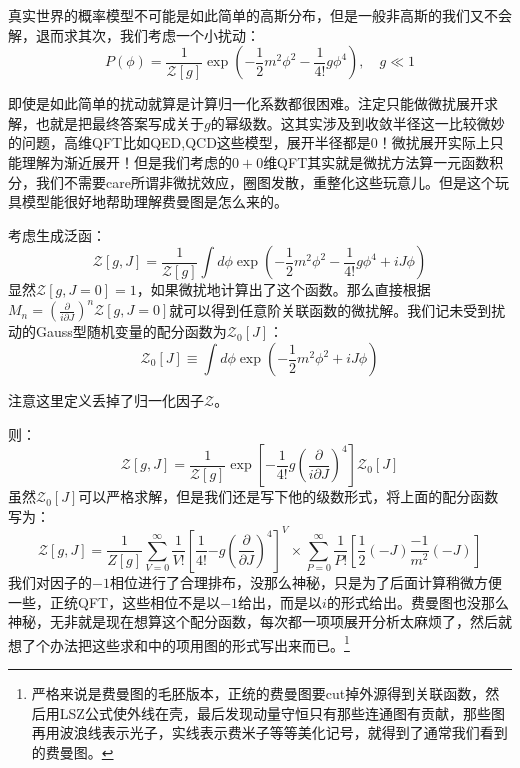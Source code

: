 真实世界的概率模型不可能是如此简单的高斯分布，但是一般非高斯的我们又不会解，退而求其次，我们考虑一个小扰动：
\begin{equation}
	P(\phi)=\frac1{\mathcal{Z}[g]}\exp(-\frac12m^2\phi^2-\frac1{4!}g\phi^4),\quad g\ll 1
\end{equation}

即使是如此简单的扰动就算是计算归一化系数都很困难。注定只能做微扰展开求解，也就是把最终答案写成关于$g$的幂级数。这其实涉及到收敛半径这一比较微妙的问题，高维QFT比如QED,QCD这些模型，展开半径都是0！微扰展开实际上只能理解为渐近展开！但是我们考虑的$0+0$维QFT其实就是微扰方法算一元函数积分，我们不需要care所谓非微扰效应，圈图发散，重整化这些玩意儿。但是这个玩具模型能很好地帮助理解费曼图是怎么来的。

考虑生成泛函：
\begin{equation}
	\mathcal{Z}[g,J]=\frac1{\mathcal{Z}[g]}\int d\phi\exp(-\frac12m^2\phi^2-\frac1{4!}g\phi^4+iJ\phi)
\end{equation}
显然$\mathcal{Z}[g,J=0]=1$，如果微扰地计算出了这个函数。那么直接根据$M_n=\left(\frac{\partial}{i\partial J}\right)^n\mathcal{Z}[g,J=0]$就可以得到任意阶关联函数的微扰解。我们记未受到扰动的Gauss型随机变量的配分函数为$\mathcal{Z}_0[J]$：
\begin{equation}
	\mathcal{Z}_0[J]\equiv \int d\phi \exp(-\frac{1}{2}m^2\phi^2+iJ\phi)
\end{equation}
\begin{remark}
	注意这里定义丢掉了归一化因子$\mathcal{Z}$。
\end{remark}
则：
\begin{equation}
	\mathcal{Z}[g,J]=\frac{1}{\mathcal{Z}[g]}\exp\left[-\frac1{4!}g\left(\frac{\partial}{i\partial J}\right)^4\right]\mathcal{Z}_0[J]
\end{equation}
虽然$\mathcal{Z}_0[J]$可以严格求解，但是我们还是写下他的级数形式，将上面的配分函数写为：
\begin{equation}
	\mathcal{Z}[g,J]=\frac1{Z[g]}\sum_{V=0}^{\infty}\frac{1}{V!}\left[\frac{1}{4!}{-g}\left(\frac{\partial}{\partial J}\right)^4\right]^V\times \sum_{P=0}^{\infty}\frac{1}{P!}\left[\frac12 (-J)\frac{-1}{m^2}(-J)\right]
\end{equation}
我们对因子的$-1$相位进行了合理排布，没那么神秘，只是为了后面计算稍微方便一些，正统QFT，这些相位不是以$-1$给出，而是以$i$的形式给出。费曼图也没那么神秘，无非就是现在想算这个配分函数，每次都一项项展开分析太麻烦了，然后就想了个办法把这些求和中的项用图的形式写出来而已。\footnote{严格来说是费曼图的毛胚版本，正统的费曼图要cut掉外源得到关联函数，然后用LSZ公式使外线在壳，最后发现动量守恒只有那些连通图有贡献，那些图再用波浪线表示光子，实线表示费米子等等美化记号，就得到了通常我们看到的费曼图。}

